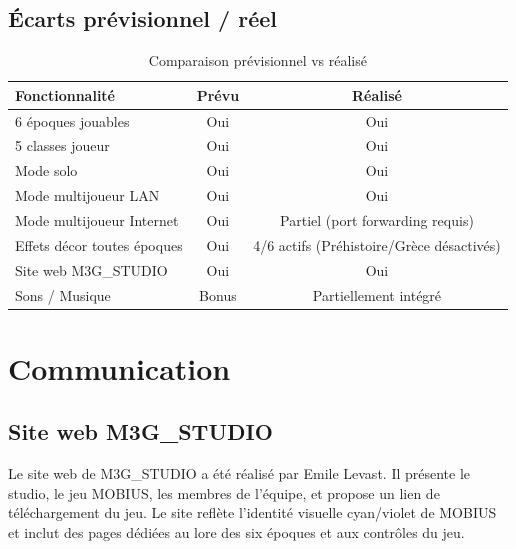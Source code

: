 \documentclass[12pt, a4paper]{report}
\begin{document}
\section{\'{E}carts pr\'{e}visionnel / r\'{e}el}

\begin{table}[H]
\centering
\caption{Comparaison pr\'{e}visionnel vs r\'{e}alis\'{e}}
\begin{tabularx}{\textwidth}{|X|c|c|}
\hline
\textbf{Fonctionnalit\'{e}} & \textbf{Pr\'{e}vu} & \textbf{R\'{e}alis\'{e}} \\
\hline
6 \'{e}poques jouables              & Oui & \textcolor{okgreen}{Oui} \\
\hline
5 classes joueur                & Oui & \textcolor{okgreen}{Oui} \\
\hline
Mode solo                       & Oui & \textcolor{okgreen}{Oui} \\
\hline
Mode multijoueur LAN            & Oui & \textcolor{okgreen}{Oui} \\
\hline
Mode multijoueur Internet       & Oui & \textcolor{warnorange}{Partiel (port forwarding requis)} \\
\hline
Effets d\'{e}cor toutes \'{e}poques    & Oui & \textcolor{warnorange}{4/6 actifs (Pr\'{e}histoire/Gr\`{e}ce d\'{e}sactiv\'{e}s)} \\
\hline
Site web M3G\_STUDIO            & Oui & \textcolor{okgreen}{Oui} \\
\hline
Sons / Musique                  & Bonus & \textcolor{warnorange}{Partiellement int\'{e}gr\'{e}} \\
\hline
\end{tabularx}
\end{table}

\chapter{Communication}

\section{Site web M3G\_STUDIO}

Le site web de M3G\_STUDIO a \'{e}t\'{e} r\'{e}alis\'{e} par Emile Levast. Il pr\'{e}sente le studio, le jeu MOBIUS, les membres de l'\'{e}quipe, et propose un lien de t\'{e}l\'{e}chargement du jeu. Le site refl\`{e}te l'identit\'{e} visuelle cyan/violet de MOBIUS et inclut des pages d\'{e}di\'{e}es au lore des six \'{e}poques et aux contr\^{o}les du jeu.
\end{document}
